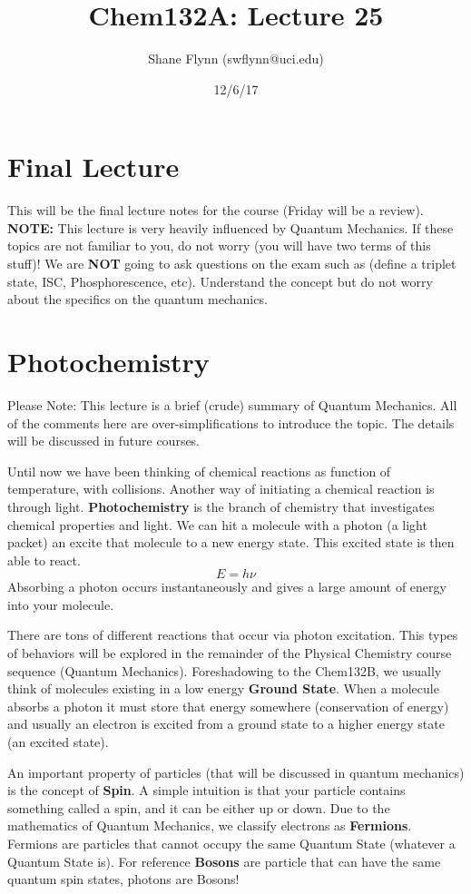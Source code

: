 \documentclass{article}
\title{Chem132A: Lecture 25}
\author{Shane Flynn (swflynn@uci.edu)}
\date{12/6/17}
\newcommand{\be}{\begin{equation}}
\newcommand{\ee}{\end{equation}}
\begin{document}
\maketitle

\section*{Final Lecture}
 This will be the final lecture notes for the course (Friday will be a review).
 \textbf{NOTE:} This lecture is very heavily influenced by Quantum Mechanics.
 If these topics are not familiar to you, do not worry (you will have two terms of this stuff)!
 We are \textbf{NOT} going to ask questions on the exam such as (define a triplet state, ISC, Phosphorescence, etc).
 Understand the concept but do not worry about the specifics on the quantum mechanics. 

 
 \section*{Photochemistry}
 Please Note: This lecture is a brief (crude) summary of Quantum Mechanics.
 All of the comments here are over-simplifications to introduce the topic.
 The details will be discussed in future courses. 
 
 Until now we have been thinking of chemical reactions as function of temperature, with collisions. 
 Another way of initiating a chemical reaction is through light. 
 \textbf{Photochemistry} is the branch of chemistry that investigates chemical properties and light. 
 We can hit a molecule with a photon (a light packet) an excite that molecule to a new energy state.
 This excited state is then able to react. 
 \be
 E = h\nu
 \ee
 Absorbing a photon occurs instantaneously and gives a large amount of energy into your molecule. 
 
 There are tons of different reactions that occur via photon excitation. 
 This types of behaviors will be explored in the remainder of the Physical Chemistry course sequence (Quantum Mechanics). 
 Foreshadowing to the Chem132B, we usually think of molecules existing in a low energy \textbf{Ground State}. 
 When a molecule absorbs  a  photon it  must store that energy somewhere (conservation of energy) and usually an electron is excited from a ground state to a higher energy state (an excited state). 
 
 An important property of particles (that will be discussed in quantum mechanics) is the concept of \textbf{Spin}.
 A simple intuition is that your particle contains something called  a spin, and it can be either up or down.
 Due to the mathematics of Quantum Mechanics, we classify electrons as \textbf{Fermions}.
 Fermions are particles that cannot occupy the same Quantum State (whatever a Quantum State is). 
 For reference \textbf{Bosons} are particle that can have the same quantum spin states, photons are Bosons!
 
\end{document}
